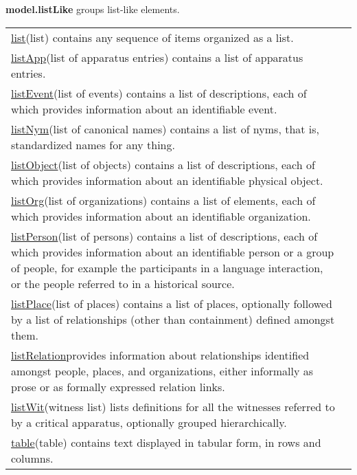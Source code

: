 \begin{sansreflist}
\item [\textbf{model.listLike}] groups list-like elements. \par 
\begin{longtable}{P{0.1834130304841602\textwidth}P{0.6665869695158398\textwidth}}
\hyperref[TEI.list]{list}\tabcellsep (list) contains any sequence of items organized as a list.\\
\hyperref[TEI.listApp]{listApp}\tabcellsep (list of apparatus entries) contains a list of apparatus entries.\\
\hyperref[TEI.listEvent]{listEvent}\tabcellsep (list of events) contains a list of descriptions, each of which provides information about an identifiable event.\\
\hyperref[TEI.listNym]{listNym}\tabcellsep (list of canonical names) contains a list of nyms, that is, standardized names for any thing.\\
\hyperref[TEI.listObject]{listObject}\tabcellsep (list of objects) contains a list of descriptions, each of which provides information about an identifiable physical object.\\
\hyperref[TEI.listOrg]{listOrg}\tabcellsep (list of organizations) contains a list of elements, each of which provides information about an identifiable organization.\\
\hyperref[TEI.listPerson]{listPerson}\tabcellsep (list of persons) contains a list of descriptions, each of which provides information about an identifiable person or a group of people, for example the participants in a language interaction, or the people referred to in a historical source.\\
\hyperref[TEI.listPlace]{listPlace}\tabcellsep (list of places) contains a list of places, optionally followed by a list of relationships (other than containment) defined amongst them.\\
\hyperref[TEI.listRelation]{listRelation}\tabcellsep provides information about relationships identified amongst people, places, and organizations, either informally as prose or as formally expressed relation links.\\
\hyperref[TEI.listWit]{listWit}\tabcellsep (witness list) lists definitions for all the witnesses referred to by a critical apparatus, optionally grouped hierarchically.\\
\hyperref[TEI.table]{table}\tabcellsep (table) contains text displayed in tabular form, in rows and columns.\end{longtable} \par
 
\end{sansreflist}
